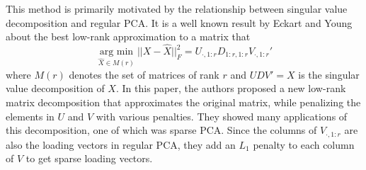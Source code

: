 \documentclass[11pt]{article}
\newcommand{\argmin}{\operatorname*{arg \ min}}
\begin{document}
This method is primarily motivated by the relationship between singular value decomposition and regular PCA. It is a well known result by Eckart and Young about the best low-rank approximation to a matrix that
$$
\argmin_{\hat{X} \in M(r)} ||X - \hat{X}||_F^2 = U_{\cdot, 1:r}D_{1:r, 1:r}V_{\cdot, 1:r}'
$$
where $M(r)$ denotes the set of matrices of rank $r$ and $UDV' = X$ is the singular value decomposition of $X$. In this paper, the authors proposed a new low-rank matrix decomposition that approximates the original matrix, while penalizing the elements in $U$ and $V$ with various penalties. They showed many applications of this decomposition, one of which was sparse PCA. Since the columns of $V_{\cdot, 1:r}$ are also the loading vectors in regular PCA, they add an $L_1$ penalty to each column of $V$ to get sparse loading vectors.
\end{document}
